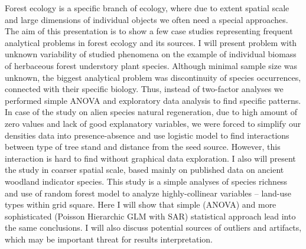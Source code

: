 \documentclass[11pt, a4paper]{article}
\begin{document}
Forest ecology is a specific branch of ecology, where due to extent
spatial scale and large dimensions of individual objects we often need a
special approaches. The aim of this presentation is to show a few case
studies representing frequent analytical problems in forest ecology and
its sources. I will present problem with unknown variability of studied
phenomena on the example of individual biomass of herbaceous forest
understory plant species. Although minimal sample size was unknown, the
biggest analytical problem was discontinuity of species occurrences,
connected with their specific biology. Thus, instead of two-factor
analyses we performed simple ANOVA and exploratory data analysis to find
specific patterns. In case of the study on alien species natural
regeneration, due to high amount of zero values and lack of good
explanatory variables, we were forced to simplify our densities data
into presence-absence and use logistic model to find interactions
between type of tree stand and distance from the seed source. However,
this interaction is hard to find without graphical data exploration. I
also will present the study in coarser spatial scale, based mainly on
published data on ancient woodland indicator species. This study is a
simple analyses of species richness and use of random forest model to
analyze highly-collinear variables -- land-use types within grid square.
Here I will show that simple (ANOVA) and more sophisticated (Poisson
Hierarchic GLM with SAR) statistical approach lead into the same
conclusions. I will also discuss potential sources of outliers and
artifacts, which may be important threat for results interpretation.
\end{document}
